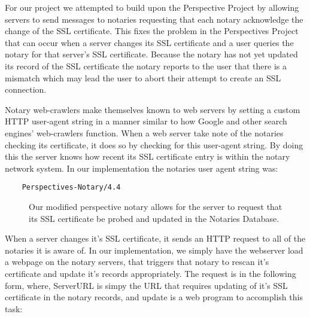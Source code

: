 \documentclass[preprint,review,12pt]{elsarticle}
\begin{document}
For our project we attempted to build upon the Perspective Project by allowing
servers to send messages to notaries requesting that each notary acknowledge
the change of the SSL certificate. This fixes the problem in the Perspectives
Project that can occur when a server changes its SSL certificate and a user
queries the notary for that server's SSL certificate. Because the notary has
not yet updated its record of the SSL certificate the notary reports to the
user that there is a mismatch which may lead the user to abort their attempt to
create an SSL connection.

Notary web-crawlers make themselves known to web servers by setting a custom
HTTP user-agent string in a manner similar to how Google and other search engines'
web-crawlers function. When a web server take note of the notaries checking its
certificate, it does so by checking for this user-agent string. By doing this the
server knows how recent its SSL certificate entry is within the notary network 
system. 
In our implementation the notaries user agent string was:

\begin{verbatim}
    Perspectives-Notary/4.4
\end{verbatim}

\begin{figure}[h]
\caption{Our modified perspective notary allows for the server to request that
    its SSL certificate be probed and updated in the Notaries Database.}
\end{figure}

When a server changes it's SSL certificate, it sends an HTTP request to all of
the notaries it is aware of. In our implementation, we simply have the webserver
load a webpage on the notary servers, that triggers that notary to rescan it's 
certificate and update it's records appropriately. The request is in the following 
form, where, ServerURL is simpy the URL that requires updating of it's SSL 
certificate in the notary records, and update is a web program
to accomplish this task:
\end{document}
